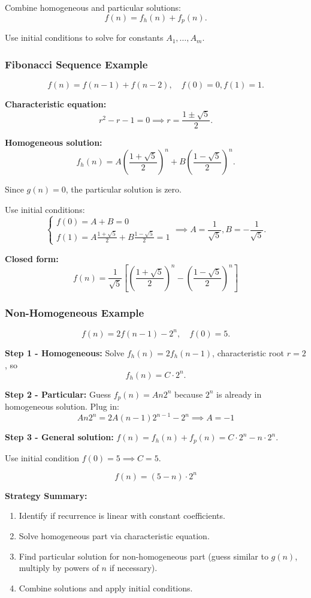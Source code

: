 \documentclass[12pt]{extarticle}
\begin{document}
Combine homogeneous and particular solutions:
\[
f(n) = f_h(n) + f_p(n).
\]

Use initial conditions to solve for constants $A_1, \dots, A_m$.

\subsubsection{Fibonacci Sequence Example}

\[
f(n) = f(n-1) + f(n-2), \quad f(0)=0, f(1)=1.
\]

\textbf{Characteristic equation:}
\[
r^2 - r - 1 = 0 \implies r = \frac{1\pm \sqrt{5}}{2}.
\]

\textbf{Homogeneous solution:}
\[
f_h(n) = A \left(\frac{1+\sqrt{5}}{2}\right)^n + B \left(\frac{1-\sqrt{5}}{2}\right)^n.
\]

Since $g(n)=0$, the particular solution is zero.

Use initial conditions:
\[
\begin{cases}
f(0) = A + B = 0 \\
f(1) = A \frac{1+\sqrt{5}}{2} + B \frac{1-\sqrt{5}}{2} = 1
\end{cases} \implies A = \frac{1}{\sqrt{5}}, B = -\frac{1}{\sqrt{5}}.
\]

\textbf{Closed form:}
\[
\boxed{f(n) = \frac{1}{\sqrt{5}}\left[ \left(\frac{1+\sqrt{5}}{2}\right)^n - \left(\frac{1-\sqrt{5}}{2}\right)^n \right]}
\]

\subsubsection{Non-Homogeneous Example}

\[
f(n) = 2 f(n-1) - 2^n, \quad f(0)=5.
\]

\textbf{Step 1 - Homogeneous:} Solve $f_h(n) = 2 f_h(n-1)$, characteristic root $r=2$, so
\[
f_h(n) = C \cdot 2^n.
\]

\textbf{Step 2 - Particular:} Guess $f_p(n) = A n 2^n$ because $2^n$ is already in homogeneous solution.  
Plug in:
\[
A n 2^n = 2 A (n-1) 2^{n-1} - 2^n \implies A = -1
\]

\textbf{Step 3 - General solution:} $f(n) = f_h(n) + f_p(n) = C \cdot 2^n - n \cdot 2^n$.  

Use initial condition $f(0)=5 \implies C = 5$.  

\[
\boxed{f(n) = (5 - n) \cdot 2^n}
\]

\begin{remarkbox}
\textbf{Strategy Summary:}
\begin{enumerate}
    \item Identify if recurrence is linear with constant coefficients.
    \item Solve homogeneous part via characteristic equation.
    \item Find particular solution for non-homogeneous part (guess similar to $g(n)$, multiply by powers of $n$ if necessary).
    \item Combine solutions and apply initial conditions.
\end{enumerate}
\end{remarkbox}
\end{document}
